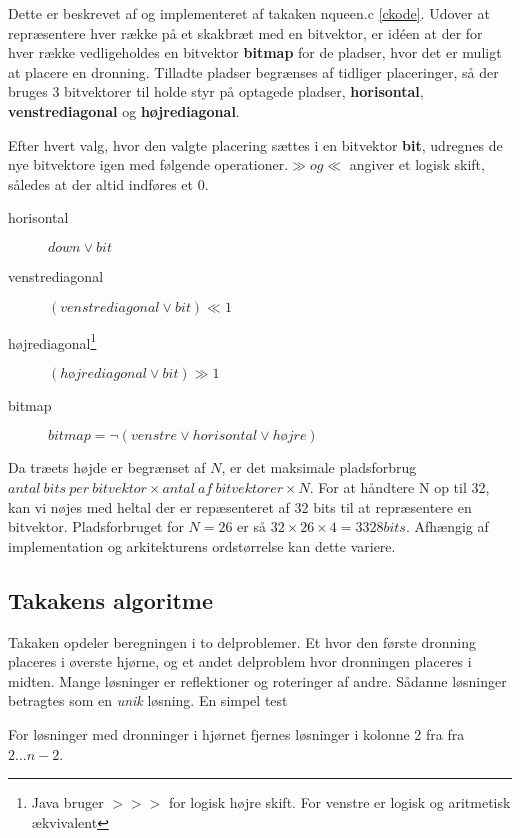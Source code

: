 \documentclass[pdf,draft,a4paper,10pt]{article}
\begin{document}

Dette er beskrevet af \cite{Zongyan02} og implementeret af takaken nqueen.c \ref{ckode}. Udover at repræsentere hver række på et skakbræt med en bitvektor, er idéen at der for hver række vedligeholdes en bitvektor \textbf{bitmap} for de pladser, hvor det er muligt at placere en dronning.  Tilladte pladser begrænses af tidliger placeringer, så der bruges 3 bitvektorer til holde styr på optagede pladser, \textbf{horisontal}, \textbf{venstrediagonal}  og \textbf{højrediagonal}.

Efter hvert valg, hvor den valgte placering sættes i en bitvektor \textbf{bit}, udregnes de nye bitvektore igen med følgende operationer.$\gg og \ll$ angiver et logisk skift, således at der altid indføres et $0$.
\begin{description}
	\item[horisontal] $down \lor bit$ 
	\item[venstrediagonal] $(venstrediagonal \lor bit) \ll 1$
	\item[højrediagonal\footnote{Java bruger $>>>$ for logisk højre skift. For venstre er logisk og aritmetisk ækvivalent}] $(højrediagonal \lor bit) \gg 1$
	\item[bitmap]	$bitmap = \lnot(venstre \lor horisontal \lor højre)$	
\end{description}

Da træets højde er begrænset af $N$, er det maksimale pladsforbrug $antal\ bits\ per\ bitvektor \times antal\ af\ bitvektorer \times N$. For at håndtere N op til 32, kan vi nøjes med heltal der er repæsenteret af 32 bits til at repræsentere en bitvektor. Pladsforbruget for $N=26$ er så $32\times 26 \times 4 = 3328 bits$. Afhængig af implementation og arkitekturens ordstørrelse kan dette variere.

\subsection{Takakens algoritme}\label{takalgo}

Takaken opdeler beregningen i to delproblemer. Et hvor den første dronning placeres i øverste hjørne, og et andet delproblem hvor dronningen placeres i midten. Mange løsninger er reflektioner og roteringer af andre. Sådanne løsninger betragtes som en \textit{unik} løsning. En simpel test 




For løsninger med dronninger i hjørnet fjernes løsninger i kolonne 2 fra fra$2 \ldots n-2$. 
\end{document}
